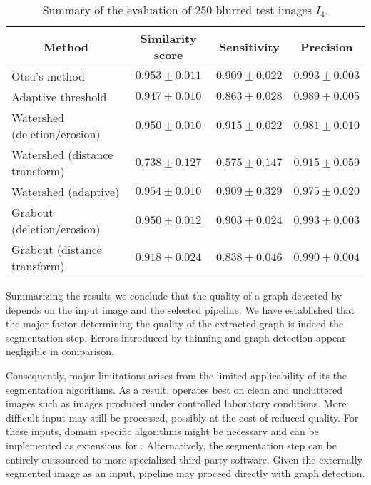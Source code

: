 		\begin{table}
			\centering
			\begin{tabular}{@{} l *3c @{}}
			\toprule
			\multicolumn{1}{c}{Method}    & Similarity score  & Sensitivity  & Precision \\ 
			\midrule
			Otsu's method                   & $0.953 \pm 0.011$ & $0.909 \pm 0.022$ & $0.993 \pm 0.003$ \\
			Adaptive threshold              & $0.947 \pm 0.010$ & $0.863 \pm 0.028$ & $0.989 \pm 0.005$ \\
			Watershed (deletion/erosion)    & $0.950 \pm 0.010$ & $0.915 \pm 0.022$ & $0.981 \pm 0.010$ \\
			Watershed (distance transform)  & $0.738 \pm 0.127$ & $0.575 \pm 0.147$ & $0.915 \pm 0.059$ \\
			Watershed (adaptive)            & $0.954 \pm 0.010$ & $0.909 \pm 0.329$ & $0.975 \pm 0.020$ \\
			Grabcut (deletion/erosion)      & $0.950 \pm 0.012$ & $0.903 \pm 0.024$ & $0.993 \pm 0.003$ \\
			Grabcut (distance transform)    & $0.918 \pm 0.024$ & $0.838 \pm 0.046$ & $0.990 \pm 0.004$ \\
			\bottomrule
			\end{tabular}
			\caption[\NEFIs evaluation: Images with a blur]{Summary of the evaluation of $250$ blurred test images $I_4$.}
			\label{tab:blur}
		\end{table}

		Summarizing the results we conclude that the quality of a graph detected by \NEFI depends on the input image and the selected pipeline. We have established that the major factor determining the quality of the extracted graph is indeed the segmentation step. Errors introduced by thinning and graph detection appear negligible in comparison. 

		Consequently, \NEFIs major limitations arises from the limited applicability of its the segmentation algorithms. As a result, \NEFI operates best on clean and uncluttered images such as images produced under controlled laboratory conditions. More difficult input may still be processed, possibly at the cost of reduced quality. For these inputs, domain specific algorithms might be necessary and can be implemented as extensions for \NEFI. Alternatively, the segmentation step can be entirely outsourced to more specialized third-party software. Given the externally segmented image as an input, \NEFIs pipeline may proceed directly with graph detection.

